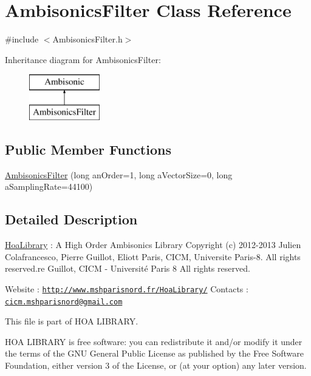 \hypertarget{class_ambisonics_filter}{\section{Ambisonics\-Filter Class Reference}
\label{class_ambisonics_filter}
}


{\ttfamily \#include $<$Ambisonics\-Filter.\-h$>$}

Inheritance diagram for Ambisonics\-Filter\-:\begin{figure}[H]
\begin{center}
\leavevmode
\includegraphics[height=2.000000cm]{class_ambisonics_filter}
\end{center}
\end{figure}
\subsection*{Public Member Functions}
\begin{DoxyCompactItemize}
\item 
\hyperlink{class_ambisonics_filter_aeeafcaad4a5d3081d777c3e8bb03ed0c}{Ambisonics\-Filter} (long an\-Order=1, long a\-Vector\-Size=0, long a\-Sampling\-Rate=44100)
\end{DoxyCompactItemize}


\subsection{Detailed Description}
\hyperlink{interface_hoa_library}{Hoa\-Library} \-: A High Order Ambisonics Library Copyright (c) 2012-\/2013 Julien Colafrancesco, Pierre Guillot, Eliott Paris, C\-I\-C\-M, Universite Paris-\/8. All rights reserved.\-re Guillot, C\-I\-C\-M -\/ Université Paris 8 All rights reserved.

Website \-: \href{http://www.mshparisnord.fr/HoaLibrary/}{\tt http\-://www.\-mshparisnord.\-fr/\-Hoa\-Library/} Contacts \-: \href{mailto:cicm.mshparisnord@gmail.com}{\tt cicm.\-mshparisnord@gmail.\-com}

This file is part of H\-O\-A L\-I\-B\-R\-A\-R\-Y.

H\-O\-A L\-I\-B\-R\-A\-R\-Y is free software\-: you can redistribute it and/or modify it under the terms of the G\-N\-U General Public License as published by the Free Software Foundation, either version 3 of the License, or (at your option) any later version.

